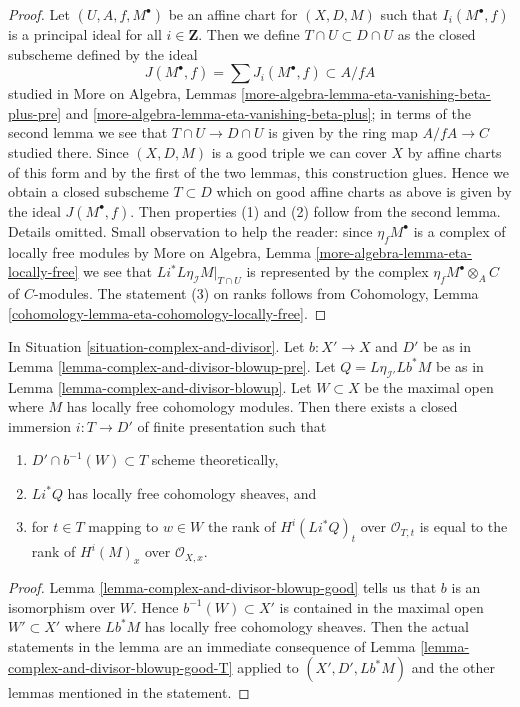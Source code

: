 \begin{proof}
Let $(U, A, f, M^\bullet)$ be an affine chart for $(X, D, M)$
such that $I_i(M^\bullet, f)$ is a principal ideal for all $i \in \mathbf{Z}$.
Then we define $T \cap U \subset D \cap U$ as the closed subscheme
defined by the ideal
$$
J(M^\bullet, f) = \sum J_i(M^\bullet, f) \subset A/fA
$$
studied in More on Algebra, Lemmas
\ref{more-algebra-lemma-eta-vanishing-beta-plus-pre} and
\ref{more-algebra-lemma-eta-vanishing-beta-plus};
in terms of the second lemma we see that $T \cap U \to D \cap U$
is given by the ring map $A/fA \to C$ studied there.
Since $(X, D, M)$ is a good triple we can cover $X$ by
affine charts of this form and by the first of the two
lemmas, this construction glues. Hence we obtain a closed
subscheme $T \subset D$ which on good affine charts as above
is given by the ideal $J(M^\bullet, f)$. Then properties
(1) and (2) follow from the second lemma. Details omitted.
Small observation to help the reader:
since $\eta_fM^\bullet$ is a complex of locally free modules
by More on Algebra, Lemma \ref{more-algebra-lemma-eta-locally-free}
we see that $Li^*L\eta_\mathcal{I}M|_{T \cap U}$
is represented by the complex $\eta_fM^\bullet \otimes_A C$
of $C$-modules. The statement (3) on ranks follows from
Cohomology, Lemma \ref{cohomology-lemma-eta-cohomology-locally-free}.
\end{proof}

\begin{lemma}
\label{lemma-complex-and-divisor-blowup-T}
In Situation \ref{situation-complex-and-divisor}. Let $b : X' \to X$
and $D'$ be as in Lemma \ref{lemma-complex-and-divisor-blowup-pre}. Let
$Q = L\eta_{\mathcal{I}'}Lb^*M$ be as in
Lemma \ref{lemma-complex-and-divisor-blowup}.
Let $W \subset X$ be the maximal open where $M$ has
locally free cohomology modules.
Then there exists a closed immersion $i : T \to D'$ of finite presentation
such that
\begin{enumerate}
\item $D' \cap b^{-1}(W) \subset T$ scheme theoretically,
\item $Li^*Q$ has locally free cohomology sheaves, and
\item for $t \in T$ mapping to $w \in W$ the rank
of $H^i(Li^*Q)_t$ over $\mathcal{O}_{T, t}$ is equal to the
rank of $H^i(M)_x$ over $\mathcal{O}_{X, x}$.
\end{enumerate}
\end{lemma}

\begin{proof}
Lemma \ref{lemma-complex-and-divisor-blowup-good} tells us that
$b$ is an isomorphism over $W$. Hence $b^{-1}(W) \subset X'$
is contained in the maximal open $W' \subset X'$ where $Lb^*M$
has locally free cohomology sheaves. Then the actual statements
in the lemma are an immediate consequence of
Lemma \ref{lemma-complex-and-divisor-blowup-good-T} applied
to $(X', D', Lb^*M)$ and the other lemmas mentioned in the statement.
\end{proof}


